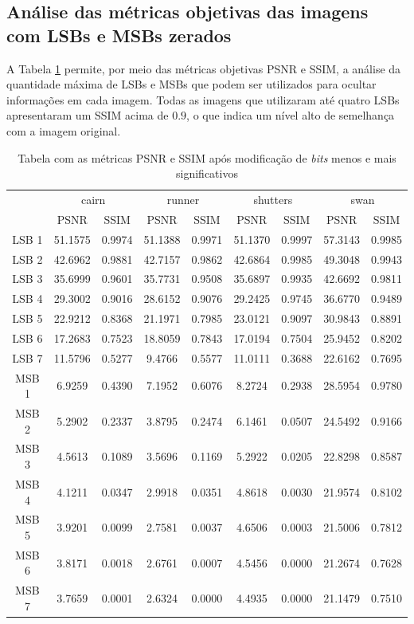 \subsection{Análise das métricas objetivas das imagens com LSBs e MSBs zerados}

A Tabela \ref{tab:resultados-psnr-ssim} permite, por meio das métricas objetivas PSNR e SSIM, a análise da quantidade máxima de LSBs e MSBs que podem ser utilizados para ocultar informações em cada imagem. Todas as imagens que utilizaram até quatro LSBs apresentaram um SSIM acima de $0.9$, o que indica um nível alto de semelhança com a imagem original.

\begin{table}
\begin{tabular}{ccccccccc}
\hline
& \multicolumn{2}{c}{cairn} & \multicolumn{2}{c}{runner} & \multicolumn{2}{c}{shutters} & \multicolumn{2}{c}{swan} \\
& PSNR & SSIM & PSNR & SSIM & PSNR & SSIM & PSNR & SSIM \\
\hline
LSB 1 & 51.1575 & 0.9974 & 51.1388 & 0.9971 & 51.1370 & 0.9997 & 57.3143 & 0.9985 \\
LSB 2 & 42.6962 & 0.9881 & 42.7157 & 0.9862 & 42.6864 & 0.9985 & 49.3048 & 0.9943 \\
LSB 3 & 35.6999 & 0.9601 & 35.7731 & 0.9508 & 35.6897 & 0.9935 & 42.6692 & 0.9811 \\
LSB 4 & 29.3002 & 0.9016 & 28.6152 & 0.9076 & 29.2425 & 0.9745 & 36.6770 & 0.9489 \\
LSB 5 & 22.9212 & 0.8368 & 21.1971 & 0.7985 & 23.0121 & 0.9097 & 30.9843 & 0.8891 \\
LSB 6 & 17.2683 & 0.7523 & 18.8059 & 0.7843 & 17.0194 & 0.7504 & 25.9452 & 0.8202 \\
LSB 7 & 11.5796 & 0.5277 & 9.4766 & 0.5577 & 11.0111 & 0.3688 & 22.6162 & 0.7695 \\
\hline
MSB 1 & 6.9259 & 0.4390 & 7.1952 & 0.6076 & 8.2724 & 0.2938 & 28.5954 & 0.9780 \\
MSB 2 & 5.2902 & 0.2337 & 3.8795 & 0.2474 & 6.1461 & 0.0507 & 24.5492 & 0.9166 \\
MSB 3 & 4.5613 & 0.1089 & 3.5696 & 0.1169 & 5.2922 & 0.0205 & 22.8298 & 0.8587 \\
MSB 4 & 4.1211 & 0.0347 & 2.9918 & 0.0351 & 4.8618 & 0.0030 & 21.9574 & 0.8102 \\
MSB 5 & 3.9201 & 0.0099 & 2.7581 & 0.0037 & 4.6506 & 0.0003 & 21.5006 & 0.7812 \\
MSB 6 & 3.8171 & 0.0018 & 2.6761 & 0.0007 & 4.5456 & 0.0000 & 21.2674 & 0.7628 \\
MSB 7 & 3.7659 & 0.0001 & 2.6324 & 0.0000 & 4.4935 & 0.0000 & 21.1479 & 0.7510 \\
\hline
\end{tabular}
\caption{Tabela com as métricas PSNR e SSIM após modificação de \textit{bits} menos e mais significativos}
\label{tab:resultados-psnr-ssim}
\end{table}

